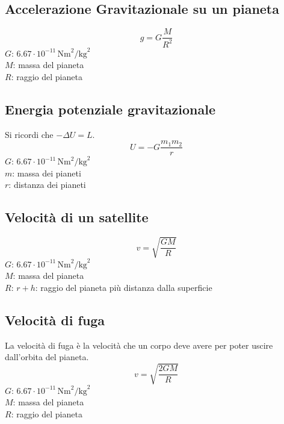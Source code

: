 \subsection{Accelerazione Gravitazionale su un pianeta}
\begin{equation*}
g = G\frac{M}{R^2}
\end{equation*}
\hyperref[tab:G]{$G$}: $6.67\cdot10^{-11}\,\text{Nm}^2\text{/kg}^2$\\
$M$: massa del pianeta\\
$R$: raggio del pianeta

\subsection{Energia potenziale gravitazionale}
Si ricordi che $-\Delta U = L$.
\begin{equation*}
  U =-G \frac{m_1m_2}{r}
\end{equation*}
\hyperref[tab:G]{$G$}: $6.67\cdot10^{-11}\,\text{Nm}^2\text{/kg}^2$\\
$m$: massa dei pianeti\\
$r$: distanza dei pianeti

\subsection{Velocità di un satellite}
\begin{equation*}
v = \sqrt{\frac{GM}{R}}
\end{equation*}
\hyperref[tab:g]{$G$}: $6.67\cdot10^{-11}\,\text{Nm}^2\text{/kg}^2$\\
$M$: massa del pianeta\\
$R$: $r + h$: raggio del pianeta più distanza dalla superficie

\subsection{Velocità di fuga}
La velocità di fuga è la velocità che un corpo deve avere per poter uscire dall'orbita del pianeta.
\begin{equation*}
v = \sqrt{\frac{2GM}{R}}
\end{equation*}
\hyperref[tab:g]{$G$}: $6.67\cdot10^{-11}\,\text{Nm}^2\text{/kg}^2$\\
$M$: massa del pianeta\\
$R$: raggio del pianeta\\
